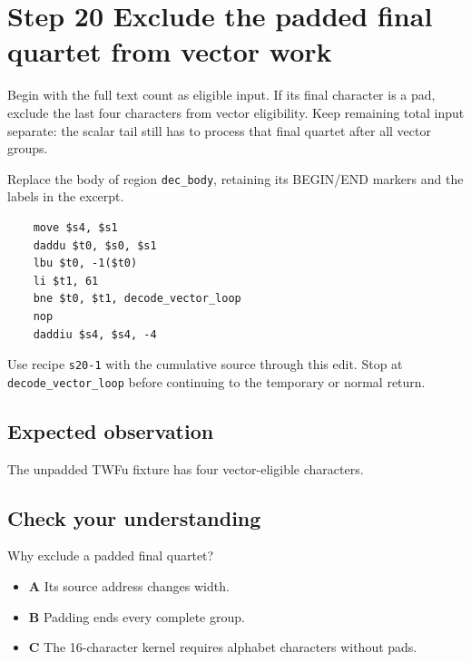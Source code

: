 \section{Step 20 Exclude the padded final quartet from vector work}\label{base64-s20}

Begin with the full text count as eligible input. If its final character is a pad, exclude the last four characters from vector eligibility. Keep remaining total input separate: the scalar tail still has to process that final quartet after all vector groups.

Replace the body of region \texttt{dec\_body}, retaining its BEGIN/END markers and the labels in the excerpt.

\begin{verbatim}
    move $s4, $s1
    daddu $t0, $s0, $s1
    lbu $t0, -1($t0)
    li $t1, 61
    bne $t0, $t1, decode_vector_loop
    nop
    daddiu $s4, $s4, -4
\end{verbatim}

Use recipe \texttt{s20-1} with the cumulative source through this edit. Stop at \texttt{decode\_vector\_loop} before continuing to the temporary or normal return.

\subsection{Expected observation}
The unpadded TWFu fixture has four vector-eligible characters.

\subsection{Check your understanding}
Why exclude a padded final quartet?

\begin{itemize}
\item \textbf{A} Its source address changes width.
\item \textbf{B} Padding ends every complete group.
\item \textbf{C} The 16-character kernel requires alphabet characters without pads.
\end{itemize}
